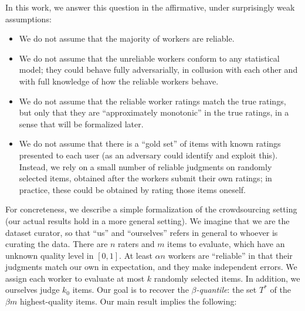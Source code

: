 In this work, we answer this question in the affirmative, under surprisingly 
weak assumptions:
\begin{itemize}[itemsep=2pt,topsep=0pt,parsep=0pt,partopsep=0pt,leftmargin=30pt]
\item We do not assume that the majority of workers are reliable.
\item We do not assume that the unreliable workers conform to any statistical 
      model; they could behave fully adversarially, in collusion with each other 
      and with full knowledge of how the reliable workers behave.
\item We do not assume that the reliable worker ratings match the true ratings, but only that they are 
      ``approximately monotonic'' in the true ratings, in a sense that will be 
      formalized later.
\item We do not assume that there is a ``gold set'' of items with known ratings 
      presented to each user (as an adversary could identify and exploit this). 
      Instead, we rely on a small number of reliable judgments on randomly selected items, 
      obtained after the workers submit their own ratings; 
      in practice, these could be obtained by rating those items oneself.
\end{itemize}
For concreteness, we describe a simple formalization of the crowdsourcing 
setting (our actual results hold in a more general setting). 
We imagine that we are the dataset curator, so that ``us'' and ``ourselves'' refers 
in general to whoever is curating the data.
There are $n$ raters and $m$ items to evaluate, which have an unknown 
quality level in $[0,1]$. At least $\alpha n$ workers are ``reliable'' in that 
their judgments match our own in expectation, and they make independent errors.
We assign each worker to evaluate at most $k$ randomly selected items. 
In addition, we ourselves judge $k_0$ items. Our goal is to 
recover the \emph{$\beta$-quantile}: the set $T^*$ of the $\beta m$ highest-quality items. 
%
Our main result implies the following:



